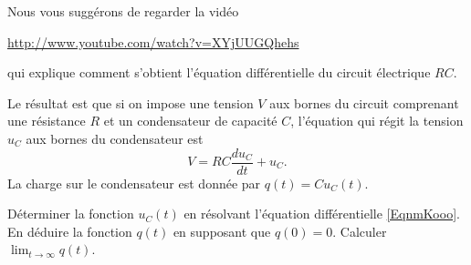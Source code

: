 
\begin{exercice}\label{exoSVT-0005}

    Nous vous suggérons de regarder la vidéo

    \url{http://www.youtube.com/watch?v=XYjUUGQhehs}

    \noindent qui explique comment s'obtient l'équation différentielle du circuit électrique \( RC\).

    Le résultat est que si on impose une tension \( V\) aux bornes du circuit comprenant une résistance \( R\) et un condensateur de capacité \( C\), l'équation qui régit la tension \( u_C\) aux bornes du condensateur est
    \begin{equation}    \label{EqnmKooo}
        V=RC\frac{ du_C }{ dt }+u_C.
    \end{equation}
    La charge sur le condensateur est donnée par \( q(t)=Cu_C(t)\).

    Déterminer la fonction \( u_C(t)\) en résolvant l'équation différentielle \eqref{EqnmKooo}. En déduire la fonction \( q(t)\) en supposant que \( q(0)=0\). Calculer \( \lim_{t\to \infty} q(t)\).

\end{exercice}
